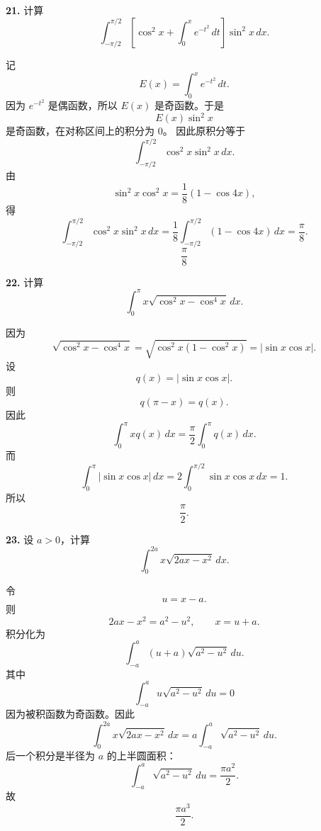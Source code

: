 \begin{problemblock}
\textbf{21.} 计算
\[
\int_{-\pi/2}^{\pi/2}
\left[\cos^2x+\int_0^x e^{-t^2}\,dt\right]\sin^2x\,dx.
\]
\end{problemblock}

\begin{solutionblock}
记
\[
E(x)=\int_0^x e^{-t^2}\,dt.
\]
因为 \(e^{-t^2}\) 是偶函数，所以 \(E(x)\) 是奇函数。于是
\[
E(x)\sin^2x
\]
是奇函数，在对称区间上的积分为 \(0\)。
因此原积分等于
\[
\int_{-\pi/2}^{\pi/2}\cos^2x\sin^2x\,dx.
\]
由
\[
\sin^2x\cos^2x=\frac18(1-\cos4x),
\]
得
\[
\int_{-\pi/2}^{\pi/2}\cos^2x\sin^2x\,dx
=\frac18\int_{-\pi/2}^{\pi/2}(1-\cos4x)\,dx
=\frac{\pi}{8}.
\]
\[
\boxed{\frac{\pi}{8}}
\]
\end{solutionblock}

\begin{problemblock}
\textbf{22.} 计算
\[
\int_0^\pi x\sqrt{\cos^2x-\cos^4x}\,dx.
\]
\end{problemblock}

\begin{solutionblock}
因为
\[
\sqrt{\cos^2x-\cos^4x}
=\sqrt{\cos^2x(1-\cos^2x)}
=|\sin x\cos x|.
\]
设
\[
q(x)=|\sin x\cos x|.
\]
则
\[
q(\pi-x)=q(x).
\]
因此
\[
\int_0^\pi xq(x)\,dx
=\frac{\pi}{2}\int_0^\pi q(x)\,dx.
\]
而
\[
\int_0^\pi|\sin x\cos x|\,dx
=2\int_0^{\pi/2}\sin x\cos x\,dx=1.
\]
所以
\[
\boxed{\frac{\pi}{2}}.
\]
\end{solutionblock}

\begin{problemblock}
\textbf{23.} 设 \(a>0\)，计算
\[
\int_0^{2a}x\sqrt{2ax-x^2}\,dx.
\]
\end{problemblock}

\begin{solutionblock}
令
\[
u=x-a.
\]
则
\[
2ax-x^2=a^2-u^2,\qquad x=u+a.
\]
积分化为
\[
\int_{-a}^{a}(u+a)\sqrt{a^2-u^2}\,du.
\]
其中
\[
\int_{-a}^{a}u\sqrt{a^2-u^2}\,du=0
\]
因为被积函数为奇函数。因此
\[
\int_0^{2a}x\sqrt{2ax-x^2}\,dx
=a\int_{-a}^{a}\sqrt{a^2-u^2}\,du.
\]
后一个积分是半径为 \(a\) 的上半圆面积：
\[
\int_{-a}^{a}\sqrt{a^2-u^2}\,du=\frac{\pi a^2}{2}.
\]
故
\[
\boxed{\frac{\pi a^3}{2}}.
\]
\end{solutionblock}

